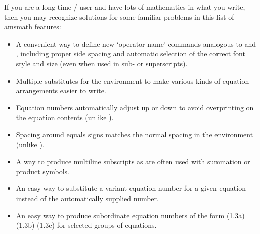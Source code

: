 \documentclass[leqno,titlepage,openany]{amsldoc}
\makeatletter
\newcommand{\nipkg}{\textsf}
\let\oldcs\cs
\def\cs#1{\texorpdfstring{\oldcs{#1}}{\@backslashchar\@backslashchar#1}}
\let\cn\cs
\makeatother
\begin{document}
If you are a long-time \latex/ user and have lots of mathematics in what
you write, then you may recognize solutions for some familiar problems
in this list of \nipkg{amsmath} features:
\begin{itemize}

\item A convenient way to define new `operator name' commands analogous
to \cn{sin} and \cn{lim}, including proper side spacing and automatic
selection of the correct font style and size (even when used in
sub- or superscripts).

\item Multiple substitutes for the  environment to make
various kinds of equation arrangements easier to write.

\item Equation numbers automatically adjust up or down to avoid
overprinting on the equation contents (unlike ).

\item Spacing around equals signs matches the normal spacing in the
 environment (unlike ).

\item A way to produce multiline subscripts as are often used with
summation or product symbols.

\item An easy way to substitute a variant equation number for a given
equation instead of the automatically supplied number.

\item An easy way to produce subordinate equation numbers of the form
(1.3a) (1.3b) (1.3c) for selected groups of equations.

\end{itemize}
\end{document}

